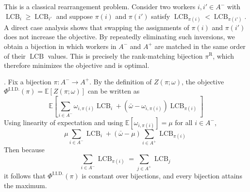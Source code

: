\documentclass[opre,blindrev]{informs3}
\newcommand{\LCB}{\operatorname{LCB}}
\newcommand{\bE}[1]{{\mathbb{E}\left[#1\right]}}
\begin{document}
\begin{APPENDICES}
    This is a classical rearrangement problem. Consider two workers \(i,i'\in A^-\) with \(\LCB_i \ge \LCB_{i'}\) and suppose \(\pi(i)\) and \(\pi(i')\) satisfy \(\LCB_{\pi(i)} < \LCB_{\pi(i')}\). A direct case analysis shows that swapping the assignments of \(\pi(i)\) and \(\pi(i')\) does not increase the objective. By repeatedly eliminating such inversions, we obtain a bijection in which workers in \(A^-\) and \(A^+\) are matched in the same order of their \(\LCB\) values. This is precisely the rank-matching bijection \(\pi^{\mathrm{R}}\), which therefore minimizes the objective and is optimal.
\Halmos\


. 
    Fix a bijection \(\pi:A^-\to A^+\). By the definition of \(Z(\pi;\omega)\), the objective \(\Phi^{\mathrm{I.I.D.}}(\pi) = \bE{Z(\pi;\omega)}\) can be written as 
    \[\bE{\sum_{i\in A^-}\omega_{i,\pi(i)}\LCB_i + (\bar{\omega}-\omega_{i,\pi(i)})\LCB_{\pi(i)}}\]
    Using linearity of expectation and using \(\bE{\omega_{i,\pi(i)}}=\mu\) for all \(i\in A^-\),
    \[\mu\sum_{i\in A^-}\LCB_i + (\bar{\omega}-\mu)\sum_{i\in A^+}\LCB_{\pi(i)}\]
    Then because 
    \[\sum_{i\in A^-}\LCB_{\pi(i)}=\sum_{j\in A^+}\LCB_j\]
    it follows that \(\Phi^{\mathrm{I.I.D.}}(\pi)\) is constant over bijections, and every bijection attains the maximum.
\Halmos



\end{APPENDICES}
\end{document}
